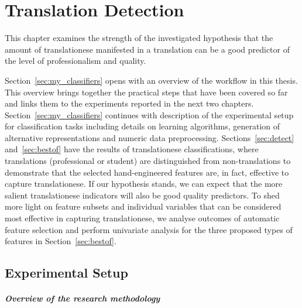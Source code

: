 \chapter{\label{cha:translationese}Translation Detection}
This chapter examines the strength of the investigated hypothesis that the amount of translationese manifested in a translation can be a good predictor of the level of professionalism and quality. 

Section~\ref{sec:my_classifiers} opens with an overview of the workflow in this thesis. This overview brings together the practical steps that have been covered so far and links them to the experiments reported in the next two chapters. Section~\ref{sec:my_classifiers} continues with description of the experimental setup for classification tasks including details on learning algorithms, generation of alternative representations and numeric data preprocessing.
Sections~\ref{sec:detect} and~\ref{sec:bestof} have the results of translationese classifications, where translations (professional or student) are distinguished from non-translations to demonstrate that the selected hand-engineered features are, in fact, effective to capture translationese. 
If our hypothesis stands, we can expect that the more salient translationese indicators will also be good quality predictors. 
To shed more light on feature subsets and individual variables that can be considered most effective in capturing translationese, we analyse outcomes of automatic feature selection and perform univariate analysis for the three proposed types of features in Section~\ref{sec:bestof}.

\section{\label{sec:my_classifiers}Experimental Setup}
\paragraph{Overview of the research methodology}

